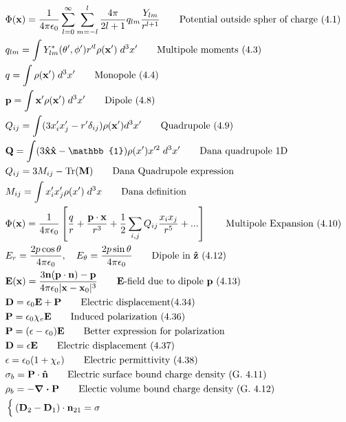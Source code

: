 \documentclass[10pt]{article}
\newcommand{\xhat}{\boldsymbol{\hat{\textbf{x}}}}
\newcommand{\zhat}{\boldsymbol{\hat{\textbf{z}}}}
\newcommand{\nhat}{\boldsymbol{\hat{\textbf{n}}}}
\newcommand{\ve}[1]{\boldsymbol{\mathbf{#1}}}
\newcommand{\vect}[1]{\boldsymbol{\mathbf{#1}}}
\newcommand{\eo}{\epsilon_0}
\newcommand{\K}{\frac{1}{4 \pi \eo}}
\begin{document}
\begin{multicols}{2}
\begin{align*}
		& \Phi(\ve{x}) = \K \sum_{l=0}^{\infty} \sum_{m=-l}^{l} \frac{4 \pi}{2 l + 1} q_{lm} \frac{Y_{lm}}{r^{l+1}} \tag*{Potential outside spher of charge (4.1)} \\
		& q_{lm} = \int Y_{lm}^*(\theta', \phi') r'^l \rho(\ve{x}') \; d^3  x' \tag*{Multipole moments (4.3)} \\
		& q = \int \rho(\vect{x}') \; d^3x'	\tag*{Monopole (4.4)} \\
		& \vect{p} = \int \vect{x}' \rho(\vect{x}') \; d^3x'	\tag*{Dipole (4.8)} \\
		& Q_{ij} = \int (3 x_i' x_j'- r' \delta_{ij})\rho(\vect{x}') d^3x'		\tag*{Quadrupole (4.9)} \\
		& \vect{Q} = \int (3 \xhat \xhat - \mathbb{1})  \rho(x') x'^2 \; d^3 x' \tag*{Dana quadrupole 1D} \\
		& Q_{ij} = 3 M_{ij} - \text{Tr}(\vect{M}) \tag*{Dana Quadrupole expression} \\
		& M_{ij} = \int x_i' x_j' \rho(x') \; d^3 x \tag*{Dana definition} \\
		&\Phi(\vect{x}) = \K \left[ \frac{q}{r} + \frac{ \vect{p} \cdot \vect{x}}{r^3} + \frac{1}{2} \sum_{i,j} Q_{ij} \frac{x_i x_j}{r^5} + ... \right] \tag*{Multipole Expansion (4.10)} \\
		& E_r=\frac{2 p \cos \theta}{4 \pi \eo}, \quad E_\theta=\frac{2 p \sin \theta}{4 \pi \eo} \tag*{Dipole in $\zhat$ (4.12)} \\
		& \vect{E}(\vect{x}) = \frac{3 \vect{n}(\vect{p} \cdot \vect{n}) - \vect{p}}{4 \pi \eo |\vect{x} - \vect{x}_0|^3} \tag*{$\vect{E}$-field due to dipole $\vect{p}$ (4.13)} \\
		& \vect{D} = \eo \vect{E} + \vect{P} \tag*{Electric displacement(4.34)} \\
		& \vect{P} = \eo \chi_e \vect{E} \tag*{Induced polarization (4.36)} \\
		& \ve{P} = (\epsilon - \eo) \ve{E} \tag*{Better expression for polarization} \\
		& \vect{D} = \epsilon \vect{E} \tag*{Electric displacement (4.37)} \\
		& \epsilon = \eo (1 + \chi_e) \tag*{Electric permittivity (4.38)} \\
		& \sigma_b = \ve{P} \cdot \nhat \tag*{Electric surface bound charge density (G. 4.11)} \\
		& \rho_b = - \ve{\nabla \cdot P} \tag*{Electic volume bound charge density (G. 4.12)} \\
		& \begin{cases}
			(\vect{D}_2 - \vect{D}_1) \cdot \vect{n}_{21} = \sigma \\

\end{cases}
\end{align*}
\end{multicols}
\end{document}
